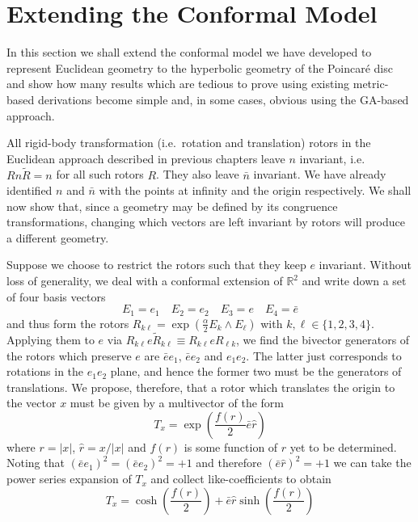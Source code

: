 \section{Extending the Conformal Model}
\label{sec:extendconfmodel}

In this section we shall extend the conformal model we have developed to
represent Euclidean geometry to the hyperbolic geometry of the Poincar\'e
disc and show how many results which are tedious to prove using existing
metric-based derivations become simple and, in some cases, obvious using the
GA-based approach.

All rigid-body transformation (i.e.\ rotation and translation) rotors in 
the Euclidean approach described in previous chapters leave $n$ invariant, i.e.\ 
$Rn\tilde{R} = n$ for all such rotors $R$. They also leave $\bar{n}$ invariant. We have
already identified $n$ and $\bar{n}$ with the points at infinity and the origin 
respectively. We shall now show that, since a geometry may be defined by its 
congruence transformations, changing which vectors are left invariant by rotors
will produce a different geometry.

Suppose we choose to restrict the rotors such that they keep $e$
invariant. Without loss of generality, we deal with a conformal extension of
$\mathbb{R}^2$ and write down a set of four basis vectors
\begin{equation}
E_1 = e_1 \quad E_2 = e_2 \quad E_3 = e \quad E_4 = \bar{e}
\end{equation}
and thus form the rotors $R_{k\ell } = \exp\left(\frac{\alpha}{2}E_k \wedge E_\ell\right)$ with $k,\ell \in \{1,2,3,4\}$.
Applying them to $e$ via $R_{k\ell }e\tilde{R}_{k\ell } \equiv R_{k\ell }eR_{\ell k}$, we find
the bivector generators of the rotors which preserve $e$ are $\bar{e}e_1$, 
$\bar{e}e_2$ and $e_1e_2$. The latter just corresponds to rotations in the
$e_1e_2$ plane, and hence the former two must be the generators of
translations. We propose, therefore, that a rotor which translates the origin to the vector
$x$ must be given by a multivector of the form
\begin{equation}
T_x = \exp\left(\frac{f(r)}{2}\bar{e}\hat{r}\right)
\end{equation}
where $r = |x|$, $\hat{r} = x/|x|$ and $f(r)$ is some function of $r$ yet to
be determined. Noting that $(\bar{e}{e_1})^2 = (\bar{e}e_2)^2 = +1$ and therefore
$(\bar{e}\hat{r})^2 = +1$ we can take the power series expansion of $T_x$ and
collect like-coefficients to obtain
\begin{equation}
T_x = \cosh\left(\frac{f(r)}{2}\right) + \bar{e}\hat{r}\sinh\left(\frac{f(r)}{2}\right)
\label{eqn:nonEuclidTrans1}
\end{equation}

